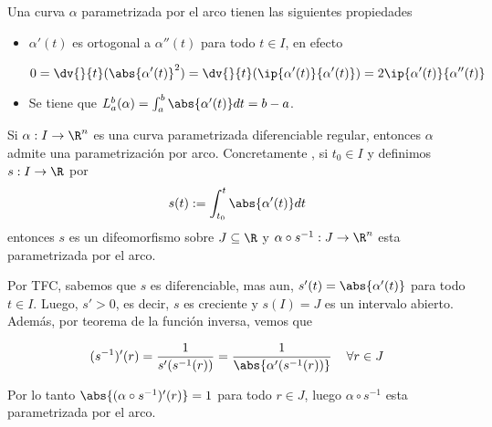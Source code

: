 \documentclass{article}
\begin{document}
\noindent Una curva $\alpha$ parametrizada por el arco tienen las siguientes propiedades

\begin{itemize}
    \item $\alpha'(t)$ es ortogonal a $\alpha''(t)$ para todo $t\in I$, en efecto
    
    \begin{equation*}
        0=\dv{}{t}(\abs{\alpha'(t)}^{2})=\dv{}{t}(\ip{\alpha'(t)}{\alpha'(t)})=2\ip{\alpha'(t)}
        {\alpha''(t)}
    \end{equation*}

    \item Se tiene que $L_{a}^{b}(\alpha)=\int_{a}^{b}\abs{\alpha'(t)}dt=b-a$.
\end{itemize}

\begin{teo}
    Si $\alpha: I\to\R^{n}$ es una curva parametrizada diferenciable regular, entonces $\alpha$
    admite una parametrización por arco. Concretamente , si $t_{0}\in I$ y definimos $s: I\to\R$ 
    por
    \begin{equation*}
        s(t):=\int_{t_{0}}^{t}\abs{\alpha'(t)}dt
    \end{equation*}
    entonces $s$ es un difeomorfismo sobre $J\subseteq\R$ y $\alpha\circ s^{-1}:J\to\R^{n}$ esta
    parametrizada por el arco.
\end{teo}

\begin{dem}
    Por TFC, sabemos que $s$ es diferenciable, mas aun, $s'(t)=\abs{\alpha'(t)}$ para todo 
    $t\in I$. Luego, $s'>0$, es decir, $s$ es creciente y $s(I)=J$ es un intervalo abierto. Además,
    por teorema de la función inversa, vemos que

    \begin{equation*}
        (s^{-1})'(r)=\frac{1}{s'(s^{-1}(r))}=\frac{1}{\abs{\alpha'(s^{-1}(r))}}\hspace{4mm}
        \forall r\in J
    \end{equation*}

    \noindent Por lo tanto $\abs{(\alpha\circ s^{-1})'(r)}=1$ para todo $r\in J$, luego 
    $\alpha\circ s^{-1}$ esta parametrizada por el arco.
\end{dem}
\end{document}
